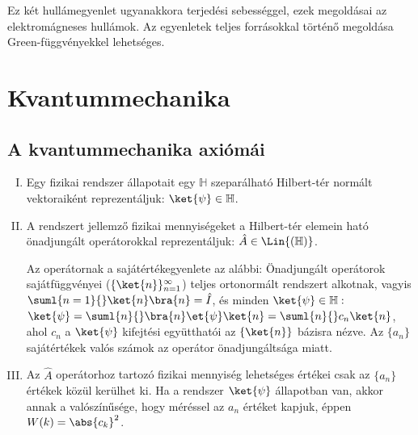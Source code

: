     Ez két hullámegyenlet ugyanakkora terjedési sebességgel, ezek megoldásai az elektromágneses hullámok.
   Az egyenletek teljes forrásokkal történő megoldása Green-függvényekkel lehetséges. 

 \section{Kvantummechanika}\label{ss:01-kvantum}
  
  \subsection{A kvantummechanika axiómái}
   
   \begin{enumerate}[I.]
    \item Egy fizikai rendszer állapotait egy $\mathbb{H}$ szeparálható Hilbert-tér normált vektoraiként reprezentáljuk: $\ket{\psi}\in\mathbb{H}$. 
    \item A rendszert jellemző fizikai mennyiségeket a Hilbert-tér elemein ható önadjungált operátorokkal reprezentáljuk: $\hat{A}\in\Lin{(\mathbb{H})}$.
    
    Az operátornak a sajátértékegyenlete az alábbi:
    Önadjungált operátorok sajátfüggvényei ($\{\ket{n}\}_{n=1}^{\infty}$) teljes ortonormált rendszert alkotnak, vagyis $\suml{n=1}{ }\ket{n}\bra{n}=\hat{I}$, és minden $\ket{\psi}\in\mathbb{H}:$ $\ket{\psi}=\suml{n}{} \bra{n}\et{\psi}\ket{n}=\suml{n}{} c_n\ket{n}$, ahol $c_n$ a $\ket{\psi}$ kifejtési együtthatói az $\{\ket{n}\}$ bázisra nézve.
   Az $\{a_n\}$ sajátértékek valós számok az operátor önadjungáltsága miatt.
    
    \item Az $\hat{A}$ operátorhoz tartozó fizikai mennyiség lehetséges értékei csak az $\{a_n\}$ értékek közül kerülhet ki.
   Ha a rendszer $\ket{\psi}$ állapotban van, akkor annak a valószínűsége, hogy méréssel az $a_n$ értéket kapjuk, éppen $W(k)=\abs{c_k}^2$.
    

\end{enumerate}
